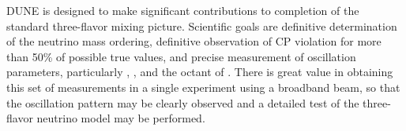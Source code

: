 DUNE is designed to make significant contributions to completion of the standard three-flavor 
mixing picture. Scientific goals are definitive determination of the neutrino mass ordering, definitive observation of CP violation for more than 50\% of possible true \deltacp values,  
and precise measurement of oscillation parameters, particularly \deltacp, , and the octant of . There is 
great value in obtaining this set of measurements in a single experiment using a broadband beam, so that the oscillation pattern may be clearly observed and a detailed test of the three-flavor neutrino model may be performed. 